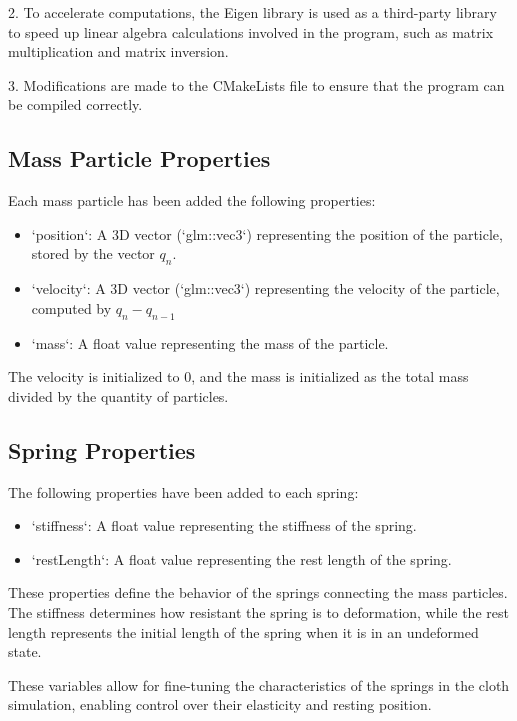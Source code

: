 \documentclass[acmtog]{acmart}
\begin{document}
2. To accelerate computations, the Eigen library is used as a third-party library to speed up linear algebra calculations involved in the program, such as matrix multiplication and matrix inversion.

3. Modifications are made to the CMakeLists file to ensure that the program can be compiled correctly.

\subsection{Mass Particle Properties}
Each mass particle has been added the following properties:

\begin{itemize}
\item `position`: A 3D vector (`glm::vec3`) representing the position of the particle, stored by the vector $q_n$.
\item `velocity`: A 3D vector (`glm::vec3`) representing the velocity of the particle, computed by $q_n - q_{n-1}$
\item `mass`: A float value representing the mass of the particle.
\end{itemize}

The velocity is initialized to 0, and the mass is initialized as the total mass divided by the quantity of particles.

\subsection{Spring Properties}

The following properties have been added to each spring:

\begin{itemize}
\item `stiffness`: A float value representing the stiffness of the spring.
\item `restLength`: A float value representing the rest length of the spring.
\end{itemize}

These properties define the behavior of the springs connecting the mass particles. The stiffness determines how resistant the spring is to deformation, while the rest length represents the initial length of the spring when it is in an undeformed state.

These variables allow for fine-tuning the characteristics of the springs in the cloth simulation, enabling control over their elasticity and resting position.
\end{document}
